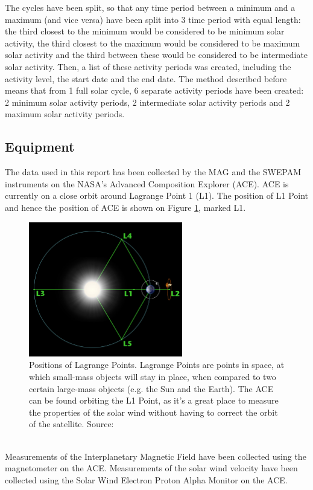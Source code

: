 \documentclass[11pt]{article}
\begin{document}
        The cycles have been split, so that any time period between a minimum and a maximum (and vice versa) have been split into 3 time period with equal length: the third closest to the minimum would be considered to be minimum solar activity, the third closest to the maximum would be considered to be maximum solar activity and the third between these would be considered to be intermediate solar activity. Then, a list of these activity periods was created, including the activity level, the start date and the end date. The method described before means that from 1 full solar cycle, 6 separate activity periods have been created: 2 minimum solar activity periods, 2 intermediate solar activity periods and 2 maximum solar activity periods.
    \subsection{Equipment}\label{sec:equipment}
        The data used in this report has been collected by the MAG and the SWEPAM instruments on the NASA's Advanced Composition Explorer (ACE)\cite{1998ace}. ACE is currently on a close orbit around Lagrange Point 1 (L1). The position of L1 Point and hence the position of ACE is shown on Figure \ref{fig:l1}, marked L1.\\
        \begin{figure}[t!]
            \centering
            \includegraphics[width=0.6\textwidth]{fig_theory/lagrange.jpg}
            \caption{Positions of Lagrange Points. Lagrange Points are points in space, at which small-mass objects will stay in place, when compared to two certain large-mass objects (e.g. the Sun and the Earth). The ACE can be found orbiting the L1 Point, as it's a great place to measure the properties of the solar wind without having to correct the orbit of the satellite. Source: \cite{lagrangeimage}}
            \label{fig:l1}
        \end{figure}\\
        Measurements of the Interplanetary Magnetic Field have been collected using the magnetometer on the ACE\cite{1998acemag}. Measurements of the solar wind velocity have been collected using the Solar Wind Electron Proton Alpha Monitor on the ACE\cite{1998aceswepam}.
\end{document}
